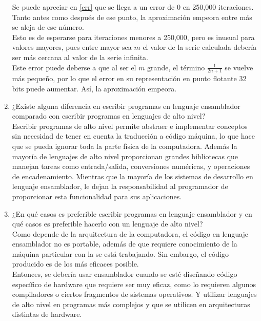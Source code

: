 \documentclass{article}
\begin{document}
\begin{enumerate}
{\begin{enumerate}
                Se puede apreciar en \eqref{err} que se llega a un error de 0 en
                250,000 iteraciones. Tanto antes como después de ese punto, la
                aproximación empeora entre más se aleja de ese número.\\
                Esto es de esperarse para iteraciones menores a 250,000, pero 
                es inusual para valores mayores, pues entre mayor sea $m$ el valor
                de la serie calculada debería ser más cercana al valor de la 
                serie infinita.\\
                Este error puede deberse a que al ser el $m$ grande, el término
                $\frac{1}{2n+1}$ se vuelve más pequeño, por lo que el error en su representación en punto flotante 32 bits puede aumentar.
                Así, la aproximación empeora.\\
            \end{enumerate}
        }
        \item ¿Existe alguna diferencia en escribir programas en lenguaje 
        ensamblador comparado con escribir programas en lenguajes de alto nivel?\\
        Escribir programas de alto nivel permite abstraer e implementar conceptos
        sin necesidad de tener en cuenta la traducción a código máquina, lo que hace que se pueda ignorar toda la parte física de la computadora. Además la mayoría de lenguajes de alto nivel proporcionan grandes bibliotecas que manejan tareas como entrada/salida, conversiones numéricas, y operaciones de encadenamiento.  Mientras que la mayoría de los sistemas de desarrollo en lenguaje ensamblador, le dejan la responsabilidad al programador de proporcionar esta funcionalidad para sus aplicaciones.
        
        \item ¿En qué casos es preferible escribir programas en lenguaje 
        ensamblador y en qué casos es preferible hacerlo con un lenguaje de alto nivel?\\
        Como depende de la arquitectura de la computadora, el código en lenguaje
        ensamblador no es portable, además de que requiere conocimiento de la
        máquina particular con la se está trabajando. Sin embargo, el código
        producido es de los más eficaces posible.\\
        Entonces, se debería usar ensamblador cuando se esté diseñando código
        específico de hardware que requiere ser muy eficaz, como lo requieren
        algunos compiladores o ciertos fragmentos de sistemas operativos. Y utilizar lenguajes de alto nivel en programas más complejos y que se utilicen en arquitecturas distintas de hardware.
        
    \end{enumerate}
\end{document}
